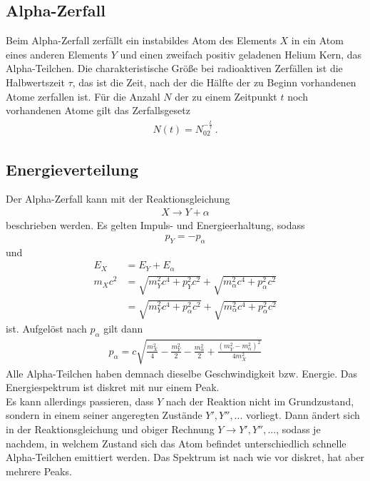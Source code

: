 \subsection{Alpha-Zerfall}
Beim Alpha-Zerfall zerfällt ein instabildes Atom des Elements $X$ in ein Atom eines anderen Elements $Y$ und einen zweifach positiv geladenen Helium Kern, das Alpha-Teilchen. Die charakteristische Größe bei radioaktiven Zerfällen ist die Halbwertszeit $\tau$, das ist die Zeit, nach der die Hälfte der zu Beginn vorhandenen Atome zerfallen ist. Für die Anzahl $N$ der zu einem Zeitpunkt $t$ noch vorhandenen Atome gilt das Zerfallsgesetz
\begin{align}
	N(t) = N_02^{-\frac{t}{\tau}} \ .
\end{align}


\subsection{Energieverteilung}
Der Alpha-Zerfall kann mit der Reaktionsgleichung
\begin{align}
        X \rightarrow Y + \alpha
\end{align}
beschrieben werden. Es gelten Impuls- und Energieerhaltung, sodass
\begin{align}
        p_Y = - p_\alpha
\end{align}
und
\begin{align}
        E_X &= E_Y + E_\alpha \\
        m_Xc^2 &= \sqrt{m_Y^2c^4 + p_Y^2c^2} + \sqrt{m_\alpha^2c^4 + p_\alpha^2c^2} \\
        &= \sqrt{m_Y^2c^4 + p_\alpha^2c^2} + \sqrt{m_\alpha^2c^4 + p_\alpha^2c^2}
\end{align}
ist. Aufgelöst nach $p_\alpha$ gilt dann
\begin{align}
        p_\alpha = c\sqrt{\frac{m_X^2}{4} - \frac{m_Y^2}{2} - \frac{m_\alpha^2}{2}+\frac{\left(m_Y^2 - m_\alpha^2\right)^2}{4m_X^2}}
\end{align}
Alle Alpha-Teilchen haben demnach dieselbe Geschwindigkeit bzw. Energie. Das Energiespektrum ist diskret mit nur einem Peak. \\
Es kann allerdings passieren, dass $Y$ nach der Reaktion nicht im Grundzustand, sondern in einem seiner angeregten Zustände $Y',Y'',...$ vorliegt. Dann ändert sich in der Reaktionsgleichung und obiger Rechnung $Y\rightarrow Y',Y'',...$, sodass je nachdem, in welchem Zustand sich das Atom befindet unterschiedlich schnelle Alpha-Teilchen emittiert werden. Das Spektrum ist nach wie vor diskret, hat aber mehrere Peaks.


